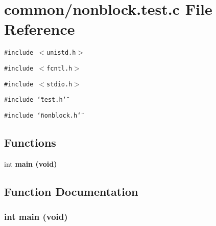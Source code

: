 \section{common/nonblock.test.c File Reference}
\label{nonblock_8test_8c}
{\tt \#include $<$unistd.h$>$}\par
{\tt \#include $<$fcntl.h$>$}\par
{\tt \#include $<$stdio.h$>$}\par
{\tt \#include \char`\"{}test.h\char`\"{}}\par
{\tt \#include \char`\"{}nonblock.h\char`\"{}}\par
\subsection*{Functions}
\begin{CompactItemize}
\item 
int \bf{main} (void)
\end{CompactItemize}


\subsection{Function Documentation}
\subsubsection{\setlength{\rightskip}{0pt plus 5cm}int main (void)}\label{nonblock_8test_8c_5ad1c26f00c2399d3a5c7850100212d0}


